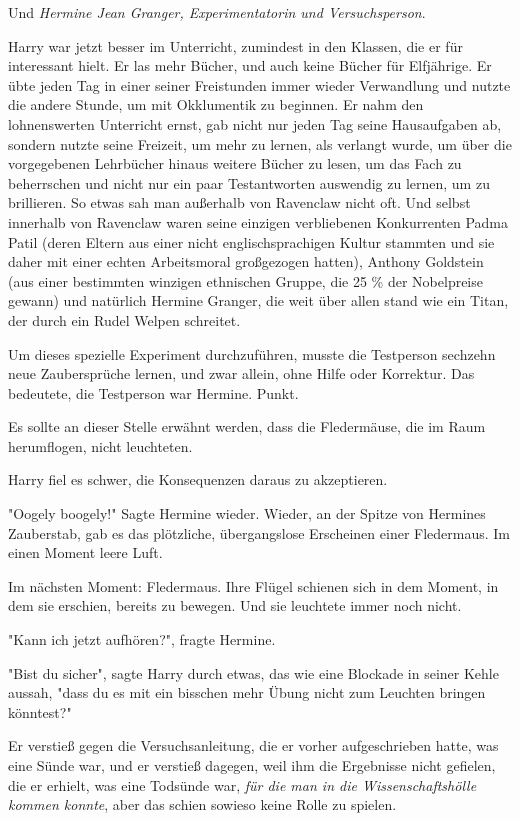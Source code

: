 {Und \emph{Hermine Jean Granger, Experimentatorin und Versuchsperson}.

Harry war jetzt besser im Unterricht, zumindest in den Klassen, die er für interessant hielt. Er las mehr Bücher, und auch keine Bücher für Elfjährige. Er übte jeden Tag in einer seiner Freistunden immer wieder Verwandlung und nutzte die andere Stunde, um mit Okklumentik zu beginnen. Er nahm den lohnenswerten Unterricht ernst, gab nicht nur jeden Tag seine Hausaufgaben ab, sondern nutzte seine Freizeit, um mehr zu lernen, als verlangt wurde, um über die vorgegebenen Lehrbücher hinaus weitere Bücher zu lesen, um das Fach zu beherrschen und nicht nur ein paar Testantworten auswendig zu lernen, um zu brillieren. So etwas sah man außerhalb von Ravenclaw nicht oft. Und selbst innerhalb von Ravenclaw waren seine einzigen verbliebenen Konkurrenten Padma Patil (deren Eltern aus einer nicht englischsprachigen Kultur stammten und sie daher mit einer echten Arbeitsmoral großgezogen hatten), Anthony Goldstein (aus einer bestimmten winzigen ethnischen Gruppe, die 25 \% der Nobelpreise gewann) und natürlich Hermine Granger, die weit über allen stand wie ein Titan, der durch ein Rudel Welpen schreitet.

Um dieses spezielle Experiment durchzuführen, musste die Testperson sechzehn neue Zaubersprüche lernen, und zwar allein, ohne Hilfe oder Korrektur. Das bedeutete, die Testperson war Hermine. Punkt.

Es sollte an dieser Stelle erwähnt werden, dass die Fledermäuse, die im Raum herumflogen, nicht leuchteten.

Harry fiel es schwer, die Konsequenzen daraus zu akzeptieren.

"Oogely boogely!" Sagte Hermine wieder. Wieder, an der Spitze von Hermines Zauberstab, gab es das plötzliche, übergangslose Erscheinen einer Fledermaus. Im einen Moment leere Luft.

Im nächsten Moment: Fledermaus. Ihre Flügel schienen sich in dem Moment, in dem sie erschien, bereits zu bewegen. Und sie leuchtete immer noch nicht.

"Kann ich jetzt aufhören?", fragte Hermine.

"Bist du sicher", sagte Harry durch etwas, das wie eine Blockade in seiner Kehle aussah, "dass du es mit ein bisschen mehr Übung nicht zum Leuchten bringen könntest?"

Er verstieß gegen die Versuchsanleitung, die er vorher aufgeschrieben hatte, was eine Sünde war, und er verstieß dagegen, weil ihm die Ergebnisse nicht gefielen, die er erhielt, was eine Todsünde war, \emph{für die man in die Wissenschaftshölle kommen konnte}, aber das schien sowieso keine Rolle zu spielen.

}
